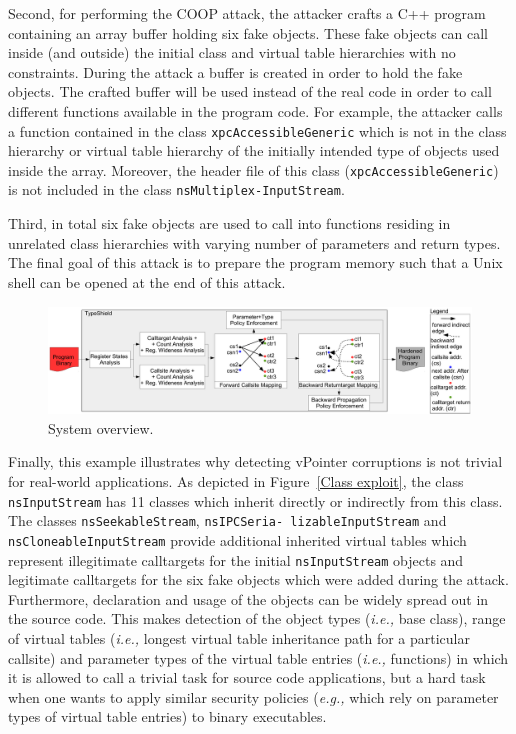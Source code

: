 Second, for performing the COOP attack, the 
attacker crafts a C++ program containing an array buffer holding six fake objects. These fake objects can call inside (and outside) 
the initial class and virtual table hierarchies with no constraints. During the attack a buffer is created in order to hold the 
fake objects. The crafted buffer will be used instead of the real code in order to call different functions available in the program code. 
For example, the attacker calls a function contained in the class \texttt{xpcAccessibleGeneric} which is not in the class 
hierarchy or virtual table hierarchy of the initially intended type of objects used inside the array. Moreover, the header 
file of this class (\texttt{xpcAccessibleGeneric}) is not included in the class \texttt{nsMultiplex-InputStream}. 

Third, in total six fake objects are used to call into functions residing in unrelated class hierarchies with varying number of parameters 
and return types. The final goal of this attack is to prepare the program memory such that a Unix shell can be opened at 
the end of this attack.

\begin{center}
\begin{figure}[t!]
\centering
   \includegraphics[width=.88\textwidth]{figures/overview.pdf}
    \caption{System overview.}
    \label{System overview.}
 \end{figure}
\end{center}

Finally, this example illustrates why detecting vPointer corruptions is not trivial for real-world applications. As depicted in 
Figure~\ref{Class exploit}, the class \texttt{nsInputStream} has 11 classes which inherit directly or indirectly from 
this class. The classes \texttt{nsSeekableStream}, \texttt{nsIPCSeria- lizableInputStream} and \texttt{nsCloneableInputStream}
provide additional inherited virtual tables which represent illegitimate calltargets for the initial \texttt{nsInputStream} 
objects and legitimate calltargets for the six fake objects which were added during the attack. Furthermore, declaration and
usage of the objects can be widely spread out in the source code. This makes detection of the object types 
(\textit{i.e.,} base class), range of virtual tables (\textit{i.e.,} longest virtual table inheritance path for a
particular callsite) and parameter types of the virtual table entries (\textit{i.e.,} functions) in which it is 
allowed to call a trivial task for source code applications, but a hard task when one wants to apply similar 
security policies (\textit{e.g.,} which rely on parameter types of virtual table entries) to binary executables.

